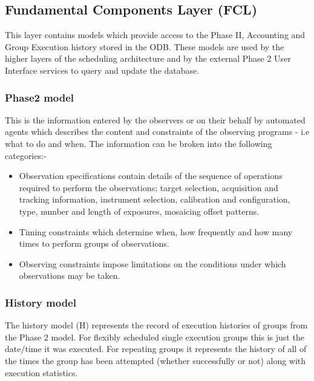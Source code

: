 \subsection{Fundamental Components Layer (FCL)}
This layer contains models which provide access to the Phase II, Accounting and Group Execution history stored in the ODB. These models are used by the higher layers of the scheduling architecture and by the external Phase 2 User Interface services to query and update the database.

\subsubsection{Phase2 model} 
This is the information entered by the observers or on their behalf by automated agents which describes the content and constraints of the observing programs - i.e what to do and when. The information can be broken into the following categories:-

\begin{itemize}
\item Observation specifications contain details of the sequence of operations required to perform the observations; target selection, acquisition and tracking information, instrument selection, calibration and configuration, type, number and length of exposures, mosaicing offset patterns.
\item Timing constraints which determine when, how frequently and how many times to perform groups of observations.
\item Observing constraints impose limitations on the conditions under which observations may be taken.
\end{itemize}

\subsubsection{History model}
The history model (H) represents the record of execution histories of groups from the Phase 2 model. For flexibly scheduled single execution groups this is just the date/time it was executed. For repeating groups it represents the history of all of the times the group has been attempted (whether successfully or not) along with execution statistics. 

